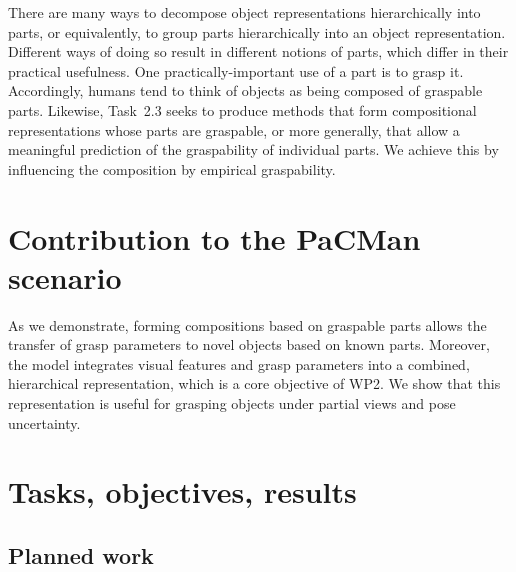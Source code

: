 \documentclass[a4paper,11pt,pdf]{pacmanreport}
\begin{document}

There are many ways to decompose object representations hierarchically
into parts, or equivalently, to group parts hierarchically into an
object representation.  Different ways of doing so result in different
notions of parts, which differ in their practical usefulness.  One
practically-important use of a part is to grasp it.  Accordingly,
humans tend to think of objects as being composed of graspable parts.
Likewise, Task~2.3 seeks to produce methods that form compositional
representations whose parts are graspable, or more generally, that
allow a meaningful prediction of the graspability of individual parts.
We achieve this by influencing the composition by empirical
graspability.


\section*{Contribution to the PaCMan scenario}


As we demonstrate, forming compositions based on graspable parts
allows the transfer of grasp parameters to novel objects based on
known parts.  Moreover, the model integrates visual features and grasp
parameters into a combined, hierarchical representation, which is a
core objective of WP2.  We show that this representation is useful for
grasping objects under partial views and pose uncertainty.

\newpage

\section{Tasks, objectives, results}

\subsection{Planned work}
\end{document}
